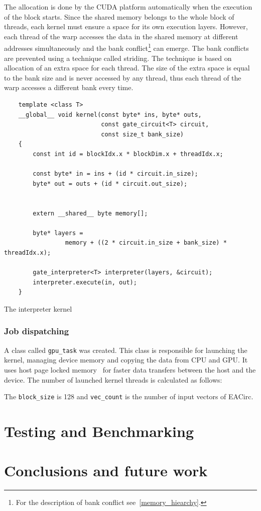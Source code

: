 \documentclass[12pt,oneside]{fithesis2}
\begin{document}
The allocation is done by the CUDA platform automatically when the execution of the block starts. Since the shared memory belongs to the whole block of threads, each kernel must ensure a space for its own execution layers. However, each thread of the warp accesses the data in the shared memory at different addresses simultaneously and the bank conflict\footnote{For the description of bank conflict see~\ref{memory_hiearchy}.} can emerge. The bank conflicts are prevented using a technique called striding. The technique is based on allocation of an extra space for each thread. The size of the extra space is equal to the bank size and is never accessed by any thread, thus each thread of the warp accesses a different bank every time.

\begin{listing}[h]
	\begin{verbatim}	
	template <class T>
	__global__ void kernel(const byte* ins, byte* outs,
	                       const gate_circuit<T> circuit,
	                       const size_t bank_size)
	{
		const int id = blockIdx.x * blockDim.x + threadIdx.x;
		
		const byte* in = ins + (id * circuit.in_size);
		byte* out = outs + (id * circuit.out_size);
		
		
		extern __shared__ byte memory[];
		
		byte* layers =
		         memory + ((2 * circuit.in_size + bank_size) * threadIdx.x);
		
		gate_interpreter<T> interpreter(layers, &circuit);
		interpreter.execute(in, out);
	}
	\end{verbatim}
	\caption{The interpreter kernel}
	\label{listing:kernel}
\end{listing}

\subsection{Job dispatching}

A class called \texttt{gpu\_task} was created. This class is responsible for launching the kernel, managing device memory and copying the data from CPU and GPU. It uses host page locked memory~\cite{cuda_guide} for faster data transfers between the host and the device. The number of launched kernel threads is calculated as follows:


\noindent
The \texttt{block\_size} is 128 and \texttt{vec\_count} is the number of input vectors of EACirc.

\chapter{Testing and Benchmarking}

\chapter{Conclusions and future work}



\printbibliography[heading=bibintoc]
\end{document}
